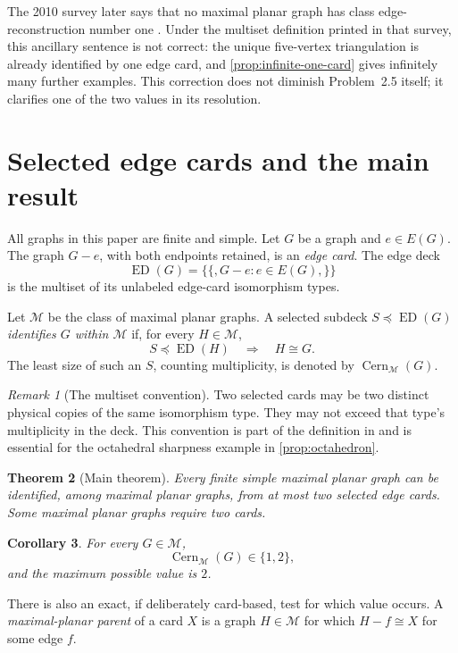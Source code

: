 \documentclass[11pt]{article}
\newtheorem{theorem}{Theorem}[section]
\newtheorem{corollary}[theorem]{Corollary}
\theoremstyle{definition}
\theoremstyle{remark}
\newtheorem{remark}[theorem]{Remark}
\newcommand{\M}{\mathcal M}
\newcommand{\ED}{\operatorname{ED}}
\newcommand{\Cern}{\operatorname{Cern}}
\begin{document}
The 2010 survey later says that no maximal planar graph has class
edge-reconstruction number one \cite[p.~453]{AsciakEtAl2010}.  Under the
multiset definition printed in that survey, this ancillary sentence is not
correct: the unique five-vertex triangulation is already identified by one
edge card, and \cref{prop:infinite-one-card} gives infinitely many further
examples.  This correction does not diminish Problem~2.5 itself; it clarifies
one of the two values in its resolution.

\section{Selected edge cards and the main result}

All graphs in this paper are finite and simple.  Let \(G\) be a graph and
\(e\in E(G)\).  The graph \(G-e\), with both endpoints retained, is an
\emph{edge card}.  The edge deck
\[
  \ED(G)=\{\!\{,G-e:e\in E(G),\}\!\}
\]
is the multiset of its unlabeled edge-card isomorphism types.

Let \(\M\) be the class of maximal planar graphs.  A selected subdeck
\(S\preccurlyeq \ED(G)\) \emph{identifies \(G\) within \(\M\)} if, for every
\(H\in\M\),
\[
             S\preccurlyeq \ED(H)\quad\Longrightarrow\quad H\cong G.
\]
The least size of such an \(S\), counting multiplicity, is denoted by
\(\Cern_{\M}(G)\).

\begin{remark}[The multiset convention]\label{rem:multiset}
Two selected cards may be two distinct physical copies of the same
isomorphism type.  They may not exceed that type's multiplicity in the deck.
This convention is part of the definition in \cite{AsciakEtAl2010} and is
essential for the octahedral sharpness example in \cref{prop:octahedron}.
\end{remark}

\begin{theorem}[Main theorem]\label{thm:main}
Every finite simple maximal planar graph can be identified, among maximal
planar graphs, from at most two selected edge cards.  Some maximal planar
graphs require two cards.
\end{theorem}

\begin{corollary}\label{cor:values}
For every \(G\in\M\),
\[
                 \Cern_{\M}(G)\in\{1,2\},
\]
and the maximum possible value is \(2\).
\end{corollary}

There is also an exact, if deliberately card-based, test for which value
occurs.  A \emph{maximal-planar parent} of a card \(X\) is a graph
\(H\in\M\) for which \(H-f\cong X\) for some edge \(f\).
\end{document}
